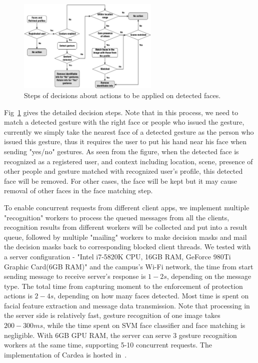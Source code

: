\begin{description}[leftmargin=0cm]
\begin{figure}[!htbp]
    \centering
    \includegraphics[width=0.6\textwidth]{figure/ch4-decisiontree.pdf}
    \caption{Steps of decisions about actions to be applied on detected faces.}
    \label{fig:ch4-decisiontree}
\end{figure}

  \item[{Decision making:}] Fig~\ref{fig:ch4-decisiontree} gives the detailed decision steps. Note that in this process, we need to match a detected gesture with the right face or people who issued the gesture, currently we simply take the nearest face of a detected gesture as the person who issued this gesture, thus it requires the user to put his hand near his face when sending "yes/no" gestures. As seen from the figure, when the detected face is recognized as a registered user, and context including location, scene, presence of other people and gesture matched with recognized user's profile, this detected face will be removed. For other cases, the face will be kept but it may cause removal of other faces in the face matching step.


  \item[{Concurrent requests:}] To enable concurrent requests from different client apps, we implement multiple "recognition" workers to process the queued messages from all the clients, recognition results from different workers will be collected and put into a result queue, followed by multiple "mailing" workers to make decision masks and mail the decision masks back to corresponding blocked client threads. We tested with a server configuration - "Intel i7-5820K CPU, 16GB RAM, GeForce 980Ti Graphic Card(6GB RAM)" and the campus's Wi-Fi network, the time from start sending message to receive server's response is $1-2s$, depending on the message type. The total time from capturing moment to the enforcement of protection actions is $2-4s$, depending on how many faces detected. Most time is spent on facial feature extraction and message data transmission. Note that processing in the server side is relatively fast, gesture recognition of one image takes $200-300ms$, while the time spent on SVM face classifier and face matching is negligible. With 6GB GPU RAM, the server can serve 3 gesture recognition workers at the same time, supporting 5-10 concurrent requests. The implementation of Cardea is hosted in~\cite{links:cardeaproj}.

\end{description}


\newpage
